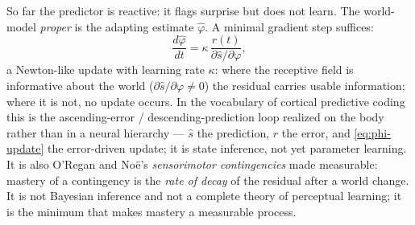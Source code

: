\documentclass{article}
\begin{document}
So far the predictor is reactive: it flags surprise but does not learn.
The world-model \emph{proper} is the adapting estimate $\hat\varphi$.  A
minimal gradient step suffices:
\begin{equation}
\frac{d\hat\varphi}{dt} = \kappa\,\frac{r(t)}{\partial\hat s/\partial\varphi},
\label{eq:phi-update}
\end{equation}
a Newton-like update with learning rate $\kappa$: where the receptive
field is informative about the world ($\partial\hat s/\partial\varphi
\neq 0$) the residual carries usable information; where it is not, no
update occurs.  In the vocabulary of cortical predictive coding this is the
ascending-error / descending-prediction loop
\citep{RaoBallard1999_PredictiveCoding} realized on the body rather than in a
neural hierarchy --- $\hat s$ the prediction, $r$ the error, and
\eqref{eq:phi-update} the error-driven update; it is state inference, not yet
parameter learning.  It is also O'Regan and No\"e's \emph{sensorimotor
contingencies}
\citep{OReganNoe2001Sensorimotor,noe_action_2004} made measurable:
mastery of a contingency is the \emph{rate of decay} of the residual
after a world change.  It is not Bayesian inference and not a complete
theory of perceptual learning; it is the minimum that makes mastery a
measurable process.
\end{document}
